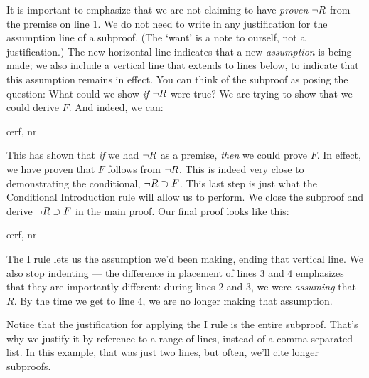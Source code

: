 \begin{ndproof}
	  
	\open
		 
		\have{}{}
	\close
\end{ndproof}

It is important to emphasize that we are not claiming to have \emph{proven} $\neg R$ from the premise on line 1. We do not need to write in any justification for the assumption line of a subproof. (The `want' is a note to ourself, not a justification.) The new horizontal line indicates that a new \emph{assumption} is being made; we also include a vertical line that extends to lines below, to indicate that this assumption remains in effect. You can think of the subproof as posing the question: What could we show \emph{if} $\neg R$ were true? We are trying to show that we could derive $F$. And indeed, we can:

\begin{ndproof}
	  
	\open
		 
		\oe{rf, nr}
	\close
\end{ndproof}

This has shown that \emph{if} we had $\neg R$ as a premise, \emph{then} we could prove $F$. In effect, we have proven that $F$ follows from $\neg R$. This is indeed very close to demonstrating the conditional, $\neg R \supset F$. This last step is just what the Conditional Introduction rule will allow us to perform. We close the subproof and derive $\neg R \supset F$ in the main proof. Our final proof looks like this:

\begin{ndproof}
	\open
		\oe{rf, nr}
	\close
\end{ndproof}

The {\eif}I rule lets us  the assumption we'd been making, ending that vertical line. We also stop indenting --- the difference in placement of lines 3 and 4 emphasizes that they are importantly different: during lines 2 and 3, we were \emph{assuming} that \enot $R$. By the time we get to line 4, we are no longer making that assumption.

Notice that the justification for applying the {\eif}I rule is the entire subproof. That's why we justify it by reference to a range of lines, instead of a comma-separated list. In this example, that was just two lines, but often, we'll cite longer subproofs.

